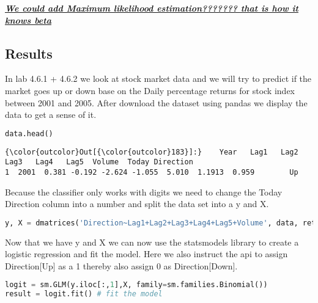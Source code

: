 \textit{\textbf{\underline{We could add Maximum likelihood estimation??????? that is how it knows beta}}}

\subsection{Results}
In lab 4.6.1 + 4.6.2 we look at stock market data and we will try to predict if the market goes up or down base on the Daily percentage returns for stock index between 2001 and 2005.
After download the dataset using pandas we display the data to get a sense of it.
\begin{lstlisting}[language=Python]
data.head()
\end{lstlisting}
\begin{Verbatim}[commandchars=\\\{\}]
{\color{outcolor}Out[{\color{outcolor}183}]:}    Year   Lag1   Lag2   Lag3   Lag4   Lag5  Volume  Today Direction
1  2001  0.381 -0.192 -2.624 -1.055  5.010  1.1913  0.959        Up
\end{Verbatim}
Because the classifier only works with digits we need to change the Today Direction column into a number and split the data set into a y and X.
\begin{lstlisting}[language=Python]
y, X = dmatrices('Direction~Lag1+Lag2+Lag3+Lag4+Lag5+Volume', data, return_type = 'dataframe')
\end{lstlisting}
Now that we have y and X we can now use the statsmodels library to create a logistic regression and fit the model. Here we also instruct the api to assign Direction[Up] as a 1 thereby also assign 0 as Direction[Down].
\begin{lstlisting}[language=Python]
logit = sm.GLM(y.iloc[:,1],X, family=sm.families.Binomial())
result = logit.fit() # fit the model
\end{lstlisting}


